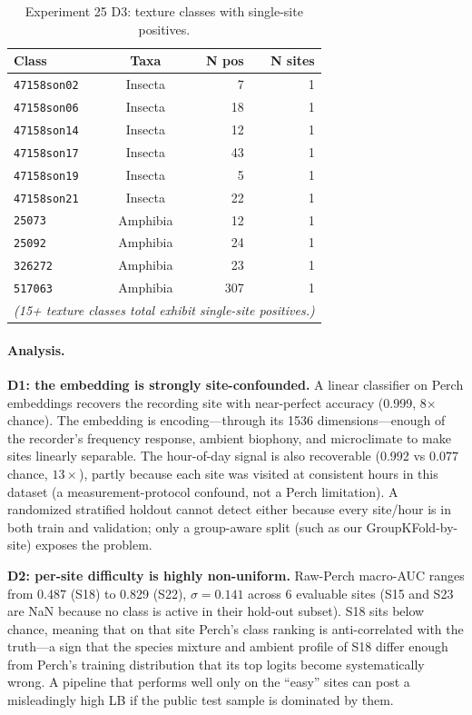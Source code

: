 \begin{table}[h]
\centering
\caption{Experiment 25 D3: texture classes with single-site positives.}
\label{tab:exp25-d3}
\begin{tabular}{lcrr}
\hline
\textbf{Class} & \textbf{Taxa} & \textbf{N pos} & \textbf{N sites} \\
\hline
\texttt{47158son02} & Insecta  & 7  & 1 \\
\texttt{47158son06} & Insecta  & 18 & 1 \\
\texttt{47158son14} & Insecta  & 12 & 1 \\
\texttt{47158son17} & Insecta  & 43 & 1 \\
\texttt{47158son19} & Insecta  & 5  & 1 \\
\texttt{47158son21} & Insecta  & 22 & 1 \\
\texttt{25073}      & Amphibia & 12 & 1 \\
\texttt{25092}      & Amphibia & 24 & 1 \\
\texttt{326272}     & Amphibia & 23 & 1 \\
\texttt{517063}     & Amphibia & 307& 1 \\
\hline
\multicolumn{4}{l}{\emph{(15+ texture classes total exhibit single-site positives.)}} \\
\end{tabular}
\end{table}

\paragraph{Analysis.}

\textbf{D1: the embedding is strongly site-confounded.} A linear classifier
on Perch embeddings recovers the recording site with near-perfect
accuracy (0.999, 8$\times$ chance). The embedding is encoding---through
its 1536 dimensions---enough of the recorder's frequency response,
ambient biophony, and microclimate to make sites linearly separable.
The hour-of-day signal is also recoverable (0.992 vs $0.077$ chance,
$13\times$), partly because each site was visited at consistent hours
in this dataset (a measurement-protocol confound, not a Perch
limitation). A randomized stratified holdout cannot detect either
because every site/hour is in both train and validation; only a
group-aware split (such as our GroupKFold-by-site) exposes the
problem.

\textbf{D2: per-site difficulty is highly non-uniform.} Raw-Perch macro-AUC
ranges from 0.487 (S18) to 0.829 (S22), $\sigma{=}0.141$ across 6
evaluable sites (S15 and S23 are NaN because no class is active in
their hold-out subset). S18 sits below chance, meaning that on that
site Perch's class ranking is anti-correlated with the truth---a sign
that the species mixture and ambient profile of S18 differ enough
from Perch's training distribution that its top logits become
systematically wrong. A pipeline that performs well only on the
``easy'' sites can post a misleadingly high LB if the public test
sample is dominated by them.


